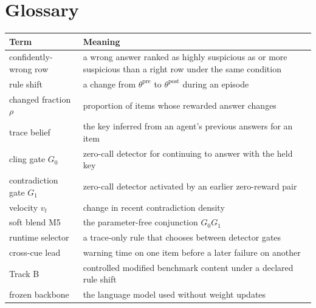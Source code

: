 \documentclass[pdflatex,sn-basic]{sn-jnl}
\makeatletter
\theoremstyle{definition}
\def\tablebodyfont{\reset@font\fontsize{10.5bp}{12.5bp}\selectfont}
\renewenvironment{table}[1][]%
{\begin{tableorg}[#1]%
  \begin{center}%
  \begin{threeparttable}%
  \tablebodyfont%
  \setlength{\parskip}{0pt}%
  \renewcommand{\arraystretch}{1.20}%
  \renewcommand\footnotetext[2][]{{\removelastskip\vskip3pt%
    \let\tablebodyfont\tablefootnotefont%
    \hskip0pt\if!##1!\else{\smash{$^{##1}$}}\fi##2\par}}%
}{\end{threeparttable}\end{center}\end{tableorg}}
\makeatother
\begin{document}
\section{Glossary}
\begin{table}[!ht]
\centering\small
\begin{tabular}{p{}p{}}
\toprule
Term & Meaning\\
\midrule
confidently-wrong row & a wrong answer ranked as highly suspicious as or more suspicious than a right row under the same condition\\
rule shift & a change from $\theta^{\mathrm{pre}}$ to $\theta^{\mathrm{post}}$ during an episode\\
changed fraction $\rho$ & proportion of items whose rewarded answer changes\\
trace belief & the key inferred from an agent's previous answers for an item\\
cling gate $G_0$ & zero-call detector for continuing to answer with the held key\\
contradiction gate $G_1$ & zero-call detector activated by an earlier zero-reward pair\\
velocity $v_t$ & change in recent contradiction density\\
soft blend M5 & the parameter-free conjunction $G_0G_1$\\
runtime selector & a trace-only rule that chooses between detector gates\\
cross-cue lead & warning time on one item before a later failure on another\\
Track B & controlled modified benchmark content under a declared rule shift\\
frozen backbone & the language model used without weight updates\\
\bottomrule
\end{tabular}
\caption{Glossary of Axon terms (appendix).}
\label{tab:glossary}
\end{table}

\begingroup
\small
\setlength{\bibsep}{3pt}

\endgroup
\end{document}
